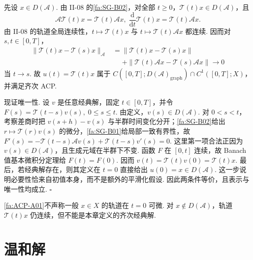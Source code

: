 \begin{FAProof}
先设 \(\displaystyle x\in D(\mathcal A)\). 由 II-08 的\autoref{fa:SG-B02}，对全部 \(\displaystyle t\geqslant0\)，\(\displaystyle\mathcal T(t)x\in D(\mathcal A)\)，且
\[
\mathcal A\mathcal T(t)x
=
\mathcal T(t)\mathcal Ax,
\;
\frac{\mathrm{d}}{\mathrm{d}t}\mathcal T(t)x
=
\mathcal T(t)\mathcal Ax.
\]
由 II-08 的轨道全局连续性，\(\displaystyle t\mapsto\mathcal T(t)x\) 与 \(\displaystyle t\mapsto\mathcal T(t)\mathcal Ax\) 都连续. 因而对 \(\displaystyle s,t\in[0,T]\)，
\[
\begin{aligned}
\|\mathcal T(t)x-\mathcal T(s)x\|_{\mathcal A}
&=
\|\mathcal T(t)x-\mathcal T(s)x\|\\
&\mathrel{\phantom{=}}+
\|\mathcal T(t)\mathcal Ax-\mathcal T(s)\mathcal Ax\|
\longrightarrow0
\end{aligned}
\]
当 \(\displaystyle t\to s\). 故 \(\displaystyle u(t)=\mathcal T(t)x\) 属于 \(\displaystyle C([0,T];D(\mathcal A)_{\mathrm{graph}})\cap C^1([0,T];X)\)，并满足齐次 ACP.

现证唯一性. 设 \(\displaystyle v\) 是任意经典解，固定 \(\displaystyle t\in[0,T]\)，并令 \(\displaystyle F(s)=\mathcal T(t-s)v(s), \; 0\leqslant s\leqslant t.\)
由定义，\(\displaystyle v(s)\in D(\mathcal A)\). 对 \(\displaystyle0<s<t\)，考察差商时把 \(\displaystyle v(s+h)-v(s)\) 与半群时间变化分开；\autoref{fa:SG-B02}给出 \(\displaystyle r\mapsto\mathcal T(r)v(s)\) 的微分，\autoref{fa:SG-B01}给局部一致有界性，故 \(\displaystyle F'(s) = -\mathcal T(t-s)\mathcal Av(s) + \mathcal T(t-s)v'(s) = 0.\)
这里第一项合法正因为 \(\displaystyle v(s)\in D(\mathcal A)\)，且生成元域在半群下不变. 函数 \(\displaystyle F\) 在 \(\displaystyle[0,t]\) 连续，故 Banach 值基本微积分定理给 \(\displaystyle F(t)=F(0)\). 因而 \(\displaystyle v(t)=\mathcal T(t)v(0)=\mathcal T(t)x.\)
最后，若经典解存在，则其定义在 \(\displaystyle t=0\) 直接给出 \(\displaystyle u(0)=x\in D(\mathcal A)\). 这一步说明必要性恰来自初值本身，而不是额外的平滑化假设. 因此两条件等价，且表示与唯一性均成立.
\hfill\(\square\)
\end{FAProof}

\begin{FARemark}[精确初值正则性]
\autoref{fa:ACP-A01}不声称一般 \(\displaystyle x\in X\) 的轨道在 \(\displaystyle t=0\) 可微. 对 \(\displaystyle x\notin D(\mathcal A)\)，轨道 \(\displaystyle\mathcal T(t)x\) 仍连续，但不能是本章定义的齐次经典解.
\end{FARemark}

\section{温和解}\label{sec:ii11-mild}

